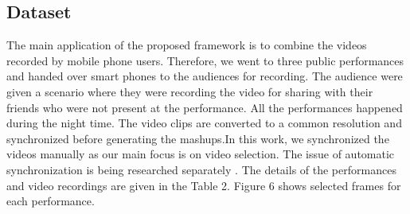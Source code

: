 \documentclass{sig-alternate}
\begin{document}
\subsection{Dataset}
The main application of the proposed framework is to combine the videos recorded by mobile phone users. Therefore, we went to three public performances and handed over smart phones to the audiences for recording. The audience were given a scenario where they were recording the video for sharing with their friends who were not present at the performance. All the performances happened during the night time. The video clips are converted to a common resolution and synchronized before generating the mashups.In this work, we synchronized the videos manually as our main focus is on video selection. The issue of automatic synchronization is being researched separately \cite{web:14}. The details of the performances and video recordings are given in the Table 2. Figure 6 shows selected frames for each performance.
\end{document}
